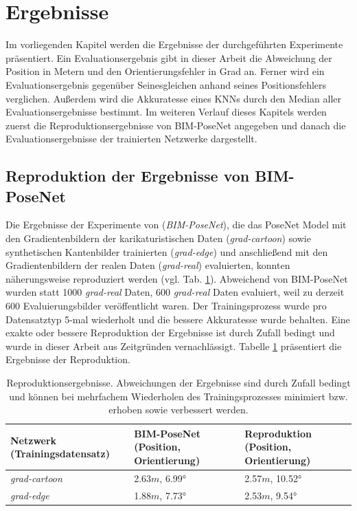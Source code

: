 
\section{Ergebnisse}
 \label{sec:kapitel_4}

Im vorliegenden Kapitel werden die Ergebnisse der durchgeführten Experimente präsentiert. Ein Evaluationsergebnis gibt in dieser Arbeit die Abweichung der Position in Metern und den Orientierungsfehler in Grad an. Ferner wird ein Evaluationsergebnis gegenüber Seinesgleichen anhand seines Positionsfehlers verglichen. Außerdem wird die Akkuratesse eines KNNs durch den Median aller Evaluationsergebnisse bestimmt. Im weiteren Verlauf dieses Kapitels werden zuerst die Reproduktionsergebnisse von BIM-PoseNet \cite{acharyaBIMPoseNetIndoorCamera2019} angegeben und danach die Evaluationsergebnisse der trainierten Netzwerke dargestellt.

\subsection{Reproduktion der Ergebnisse von BIM-PoseNet}
Die Ergebnisse der Experimente von \citet{acharyaBIMPoseNetIndoorCamera2019} (\textit{BIM-PoseNet}), die das PoseNet Model mit den Gradientenbildern der karikaturistischen Daten (\textit{grad-cartoon}) sowie synthetischen Kantenbilder trainierten (\textit{grad-edge}) und anschließend mit den Gradientenbildern der realen Daten (\textit{grad-real}) evaluierten, konnten näherungsweise reproduziert werden (vgl. Tab. \ref{tab:reproduction}). Abweichend von BIM-PoseNet wurden statt 1000 \textit{grad-real} Daten, 600 \textit{grad-real} Daten evaluiert, weil zu derzeit 600 Evaluierungsbilder veröffentlicht waren. Der Trainingsprozess wurde pro Datensatztyp 5-mal wiederholt und die bessere Akkuratesse wurde behalten. Eine exakte oder bessere Reproduktion der Ergebnisse ist durch Zufall bedingt und wurde in dieser Arbeit aus Zeitgründen vernachlässigt. Tabelle \ref{tab:reproduction} präsentiert die Ergebnisse der Reproduktion.


\begin{table}[b]
	\centering
	\caption{Reproduktionsergebnisse. Abweichungen der Ergebnisse sind durch Zufall bedingt und können bei mehrfachem Wiederholen des Trainingsprozesses minimiert bzw. erhoben sowie verbessert werden. }
	\begin{tabularx}{1.0\textwidth}{X X X}
		\textbf{Netzwerk} \hspace{2cm} (Trainingsdatensatz) & \textbf{BIM-PoseNet} \hspace{2cm} (Position, Orientierung) & \textbf{Reproduktion} \hspace{2cm} (Position, Orientierung)\\
		\hline
	 \textit{grad-cartoon} & 2.63$m$, 6.99° & 2.57$m$, 10.52°\\
		\hline
		\textit{grad-edge} & 1.88$m$, 7.73° & 2.53$m$, 9.54°\\
	\end{tabularx}
	\label{tab:reproduction}
\end{table}





